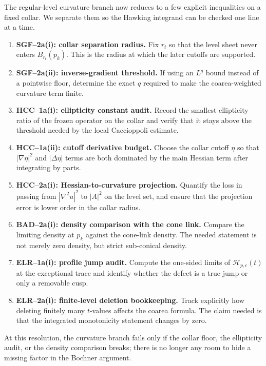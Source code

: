\begin{remark}
\label{rem:TipNeckNanoscopicCurvatureRoadmap}
The regular-level curvature branch now reduces to a few explicit inequalities
on a fixed collar.  We separate them so the Hawking integrand can be checked
one line at a time.
\begin{enumerate}
    \item \textbf{SGF--2a(i): collar separation radius.}
    Fix \(r_t\) so that the level sheet never enters \(B_{r_t}(p_k)\).  This
    is the radius at which the later cutoffs are supported.

    \item \textbf{SGF--2a(ii): inverse-gradient threshold.}
    If using an \(L^q\) bound instead of a pointwise floor, determine the exact
    \(q\) required to make the coarea-weighted curvature term finite.

    \item \textbf{HCC--1a(i): ellipticity constant audit.}
    Record the smallest ellipticity ratio of the frozen operator on the collar
    and verify that it stays above the threshold needed by the local
    Caccioppoli estimate.

    \item \textbf{HCC--1a(ii): cutoff derivative budget.}
    Choose the collar cutoff \(\eta\) so that
    \(|\nabla\eta|^2\) and \(|\Delta\eta|\) terms are both dominated by the
    main Hessian term after integrating by parts.

    \item \textbf{HCC--2a(i): Hessian-to-curvature projection.}
    Quantify the loss in passing from \(|\nabla^2u|^2\) to \(|A|^2\) on the
    level set, and ensure that the projection error is lower order in the
    collar radius.

    \item \textbf{BAD--2a(i): density comparison with the cone link.}
    Compare the limiting density at \(p_k\) against the cone-link density.
    The needed statement is not merely zero density, but strict sub-conical
    density.

    \item \textbf{ELR--1a(i): profile jump audit.}
    Compute the one-sided limits of \(\mathcal H_{p,\epsilon}(t)\) at the
    exceptional trace and identify whether the defect is a true jump or only a
    removable cusp.

    \item \textbf{ELR--2a(i): finite-level deletion bookkeeping.}
    Track explicitly how deleting finitely many \(t\)-values affects the
    coarea formula.  The claim needed is that the integrated monotonicity
    statement changes by zero.
\end{enumerate}
At this resolution, the curvature branch fails only if the collar floor, the
ellipticity audit, or the density comparison breaks; there is no longer any
room to hide a missing factor in the Bochner argument.
\end{remark}

